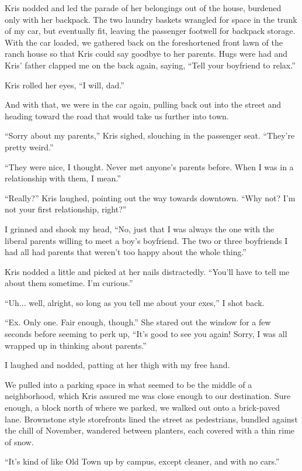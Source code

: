 Kris nodded and led the parade of her belongings out of the house, burdened only with her backpack.  The two laundry baskets wrangled for space in the trunk of my car, but eventually fit, leaving the passenger footwell for backpack storage.  With the car loaded, we gathered back on the foreshortened front lawn of the ranch house so that Kris could say goodbye to her parents.  Hugs were had and Kris' father clapped me on the back again, saying, ``Tell your boyfriend to relax.''

Kris rolled her eyes, ``I will, dad.''

And with that, we were in the car again, pulling back out into the street and heading toward the road that would take us further into town.

``Sorry about my parents,'' Kris sighed, slouching in the passenger seat. ``They're pretty weird.''

``They were nice, I thought.  Never met anyone's parents before.  When I was in a relationship with them, I mean.''

``Really?'' Kris laughed, pointing out the way towards downtown. ``Why not?  I'm not your first relationship, right?''

I grinned and shook my head, ``No, just that I was always the one with the liberal parents willing to meet a boy's boyfriend.  The two or three boyfriends I had all had parents that weren't too happy about the whole thing.''

Kris nodded a little and picked at her nails distractedly.  ``You'll have to tell me about them sometime.  I'm curious.''

``Uh... well, alright, so long as you tell me about your exes,'' I shot back.

``Ex.  Only one.  Fair enough, though.''  She stared out the window for a few seconds before seeming to perk up, ``It's good to see you again!  Sorry, I was all wrapped up in thinking about parents.''

I laughed and nodded, patting at her thigh with my free hand.

We pulled into a parking space in what seemed to be the middle of a neighborhood, which Kris assured me was close enough to our destination.  Sure enough, a block north of where we parked, we walked out onto a brick-paved lane.  Brownstone style storefronts lined the street as pedestrians, bundled against the chill of November, wandered between planters, each covered with a thin rime of snow.

``It's kind of like Old Town up by campus, except cleaner, and with no cars.''

